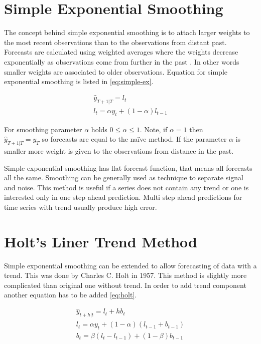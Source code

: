     \section{Simple Exponential Smoothing} \label{sec:simple-ex}
    The concept behind simple exponential smoothing is to attach larger weights to the most recent observations than
    to the observations from distant past. Forecasts are calculated using weighted averages where the weights
    decrease exponentially as observations come from further in the past \cite{hyndman-state-space}. In other words
    smaller weights are associated to older observations. Equation for simple exponential smoothing is listed in
    \ref{eq:simple-ex}.

    \begin{gather} \label{eq:simple-ex}
         \hat{y}_{T+1|T} = l_t \\ \nonumber
         l_t = \alpha y_t + (1-\alpha)l_{t-1}
    \end{gather}

    For smoothing parameter $\alpha$ holds $ 0 \leq \alpha \leq 1 $. Note, if $\alpha = 1$ then \\
    $\hat{y}_{T+1|T} = y_{T}$ so forecasts are equal to the na\"{i}ve method. If the parameter $\alpha $ is smaller
    more weight is given to the observations from distance in the past.

    Simple exponential smoothing has flat forecast function, that means all forecasts all the same. Smoothing can be
    generally used as technique to separate signal and noise. This method is useful if a series does not contain any
    trend or one is interested only in one step ahead prediction. Multi step ahead predictions for time series with
    trend usually produce high error.

    \section{Holt's Liner Trend Method} \label{sec:double-ex}
    Simple exponential smoothing can be extended to allow forecasting of data with a trend. This was done by
    Charles C. Holt in 1957. This method is slightly more complicated than original one without trend.
    In order to add trend component another equation has to be added \ref{eq:holt}.

    \begin{gather} \label{eq:holt}
        \hat{y}_{t+h|t} = l_{t} + hb_{t} \\ \nonumber
         l_t = \alpha y_t + (1 - \alpha) (l_{t-1} + b_{t-1}) \\ \nonumber
         b_t = \beta (l_t - l_{t-1}) + (1 - \beta)b_{t-1} 
    \end{gather}

